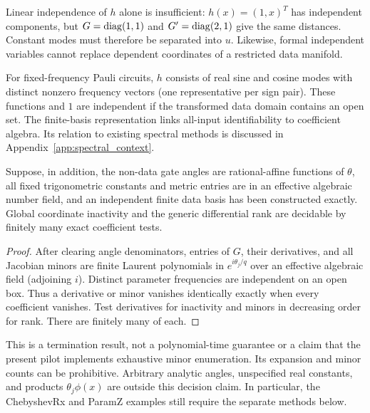 Linear independence of $h$ alone is insufficient: $h(x)=(1,x)^T$
has independent components, but $G=\operatorname{diag}(1,1)$ and $G'=\operatorname{diag}(2,1)$
give the same distances. Constant modes must therefore be separated
into $u$. Likewise, formal independent variables cannot replace
dependent coordinates of a restricted data manifold.

For fixed-frequency Pauli circuits, $h$ consists of real sine and
cosine modes with distinct nonzero frequency vectors (one representative
per sign pair). These functions and $1$ are independent if the
transformed data domain contains an open set. The finite-basis representation links all-input identifiability to
coefficient algebra. Its relation to existing spectral methods is
discussed in Appendix~\ref{app:spectral_context}.



\begin{corollary}
\label{cor:gramdecision}
Suppose, in addition, the non-data gate angles are rational-affine
functions of $\theta$, all fixed trigonometric constants and metric
entries are in an effective algebraic number field, and an independent
finite data basis has been constructed exactly. Global coordinate
inactivity and the generic differential rank are decidable by finitely
many exact coefficient tests.
\end{corollary}
\begin{proof}
After clearing angle denominators, entries of $G$, their derivatives,
and all Jacobian minors are finite Laurent polynomials in
$e^{i\theta_j/q}$ over an effective algebraic field (adjoining $i$).
Distinct parameter frequencies are independent on an open box.
Thus a derivative or minor vanishes identically exactly when every
coefficient vanishes. Test derivatives for inactivity and minors in
decreasing order for rank. There are finitely many of each.
\end{proof}
This is a termination result, not a polynomial-time guarantee or a
claim that the present pilot implements exhaustive minor enumeration.
Its expansion and minor counts can be prohibitive. Arbitrary analytic
angles, unspecified real constants, and products $\theta_j\phi(x)$
are outside this decision claim. In particular, the ChebyshevRx and
ParamZ examples still require the separate methods below.

